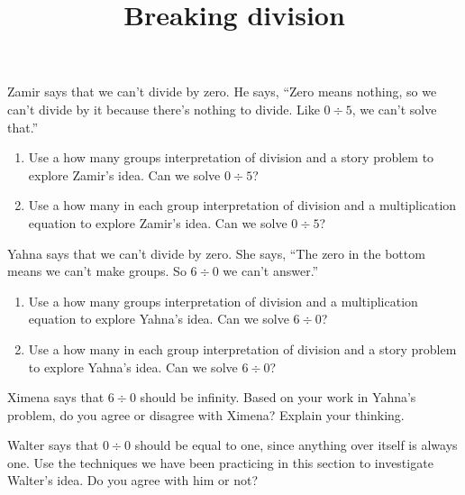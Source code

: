 \documentclass[nooutcomes,noauthor]{ximera}
\title{Breaking division}
\begin{document}
\begin{abstract}
\end{abstract}

\maketitle

\begin{problem}
Zamir says that we can't divide by zero. He says, ``Zero means nothing, so we can't divide by it because there's nothing to divide. Like $0 \div 5$, we can't solve that.''

\begin{enumerate}
	\item Use a how many groups interpretation of division and a story problem to explore Zamir's idea. Can we solve $0 \div 5$?
	\item Use a how many in each group interpretation of division and a multiplication equation to explore Zamir's idea. Can we solve $0 \div 5$?
\end{enumerate}
\end{problem}



\begin{problem}
Yahna says that we can't divide by zero. She says, ``The zero in the bottom means we can't make groups. So $6 \div 0$ we can't answer.''
\begin{enumerate}
	\item Use a how many groups interpretation of division and a multiplication equation to explore Yahna's idea. Can we solve $6 \div 0$?
	\item Use a how many in each group interpretation of division and a story problem to explore Yahna's idea. Can we solve $6 \div 0$?
\end{enumerate}
\end{problem}



\begin{problem}
Ximena says that $6 \div 0$ should be infinity. Based on your work in Yahna's problem, do you agree or disagree with Ximena? Explain your thinking.
\end{problem}



\begin{problem}
Walter says that $0 \div 0$ should be equal to one, since anything over itself is always one. Use the techniques we have been practicing in this section to investigate Walter's idea. Do you agree with him or not?
\end{problem}
\end{document}
